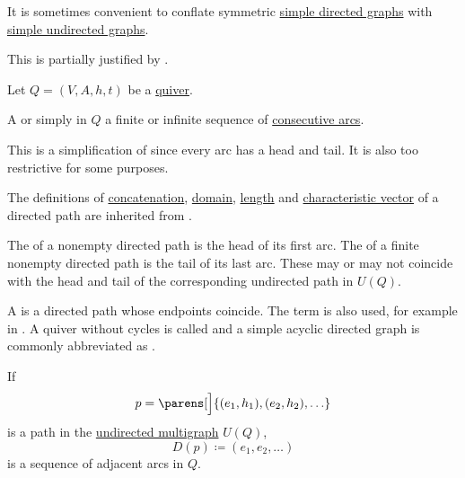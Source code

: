 \begin{remark}\label{rem:symmetric_directed_graphs}
  It is sometimes convenient to conflate symmetric \hyperref[def:quiver/simple]{simple directed graphs} with \hyperref[def:undirected_multigraph]{simple undirected graphs}.

  This is partially justified by .
\end{remark}

\begin{definition}\label{def:quiver_path}
  Let \( Q = (V, A, h, t) \) be a \hyperref[def:quiver]{quiver}.

  \begin{thmenum}
     A  or simply  in \( Q \) a finite or infinite sequence of \hyperref[def:quiver/adjacency]{consecutive arcs}.

    This is a simplification of  since every arc has a head and tail. It is also too restrictive for some purposes.

    The definitions of \hyperref[def:undirected_multigraph_path/concatenation]{concatenation}, \hyperref[def:undirected_multigraph_path/domain]{domain}, \hyperref[def:undirected_multigraph_path/length]{length} and \hyperref[def:undirected_multigraph_path/characteristic_vector]{characteristic vector} of a directed path are inherited from .

     The  of a nonempty directed path is the head of its first arc. The  of a finite nonempty directed path is the tail of its last arc. These may or may not coincide with the head and tail of the corresponding undirected path in \( U(Q) \).

     A  is a directed path whose endpoints coincide. The term  is also used, for example in \cite[ch. 1, sec. 3.2]{GondranMinoux1984Graphs}. A quiver without cycles is called  and a simple acyclic directed graph is commonly abbreviated as .

     If
    \begin{equation*}
      p = \parens[\Big]{ (e_1, h_1), (e_2, h_2), \ldots }
    \end{equation*}
    is a path in the \hyperref[def:undirected_multigraph]{undirected multigraph} \( U(Q) \),
    \begin{equation*}
      D(p) \coloneqq (e_1, e_2, \ldots)
    \end{equation*}
    is a sequence of adjacent arcs in \( Q \).


\end{thmenum}
\end{definition}
